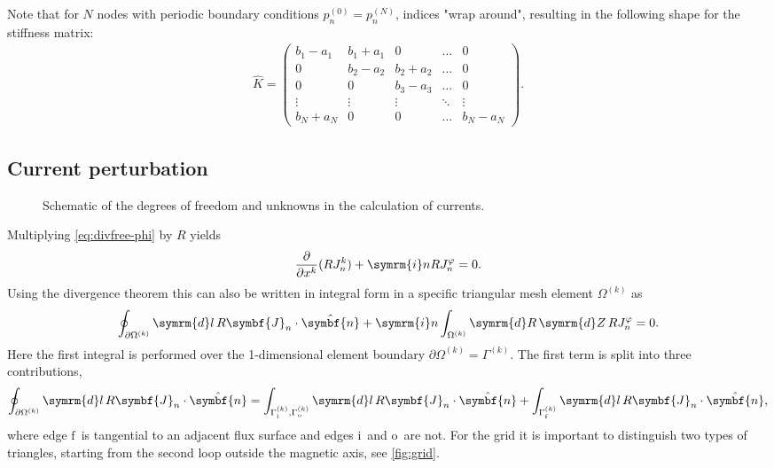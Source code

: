 \documentclass[a4paper, twoside, 10pt, english]{article}
\numberwithin{equation}{section}
\let\temp\varrho
\let\varrho\rho
\let\rho\temp
\let\temp\vartheta
\let\vartheta\theta
\let\theta\temp
\let\temp\varphi
\let\varphi\phi
\let\phi\temp
\let\vec\symbf
\newcommand*\diff{\ensuremath{\symrm{d}}}  %
\newcommand*\im{\ensuremath{\symrm{i}}}  %
\newcommand*\pd[2][]{\ensuremath{\frac{\partial #1}{\partial #2}}}  %
\newcommand*\fs{\ensuremath{\textrm{f}}}  %
\newcommand*\inw{\ensuremath{\textrm{i}}}  %
\newcommand*\out{\ensuremath{\textrm{o}}}  %
\begin{document}
Note that for $N$ nodes with periodic boundary conditions $p_{n}^{(0)} = p_{n}^{(N)}$, indices "wrap around", resulting in the following shape for the stiffness matrix:
\begin{gather*}
  \hat{K} = \begin{pmatrix}
    b_{1} - a_{1} &  b_{1} + a_{1} &        0       & \hdots &    0   \\
           0       & b_{2} - a_{2} &  b_{2} + a_{2} & \hdots &    0   \\
           0       &        0       & b_{3} - a_{3} & \hdots &    0   \\
        \vdots     &     \vdots     &     \vdots     & \ddots & \vdots \\
     b_{N} + a_{N} &        0       &        0       & \hdots & b_{N} - a_{N}
  \end{pmatrix}.
\end{gather*}

\subsection{Current perturbation}
\label{sec:compute_currn}

\begin{figure}[bth]
  \centering
  
  \caption{Schematic of the degrees of freedom and unknowns in the calculation of currents.}
  \label{fig:current_perturbation}
\end{figure}

Multiplying \cref{eq:divfree-phi} by $R$ yields
\begin{gather}
  \pd{x^{k}} (R J_{n}^{k}) + \im n R J_{n}^{\phi} = 0.
\end{gather}
Using the divergence theorem this can also be written in integral form in a specific triangular mesh element $\Omega^{(k)}$ as
\begin{gather}
  \oint_{\partial \Omega^{(k)}} \diff l \, R \vec{J}_{n} \cdot \hat{\vec{n}} + \im n \int_{\Omega^{(k)}} \diff R \, \diff Z \, R J_{n}^{\phi} = 0.
\end{gather}
Here the first integral is performed over the 1-dimensional element boundary $\partial \Omega^{(k)} = \Gamma^{(k)}$. The first term is split into three contributions,
\begin{gather}
  \oint_{\partial \Omega^{(k)}} \diff l \, R \vec{J}_{n} \cdot \hat{\vec{n}} = \int_{\Gamma_{\inw}^{(k)}, \Gamma_{\out}^{(k)}} \diff l \, R \vec{J}_{n} \cdot \hat{\vec{n}} + \int_{\Gamma_{\fs}^{(k)}} \diff l \, R \vec{J}_{n} \cdot \hat{\vec{n}},
\end{gather}
where edge \fs\ is tangential to an adjacent flux surface and edges \inw\ and \out\ are not. For the grid it is important to distinguish two types of triangles, starting from the second loop outside the magnetic axis, see \cref{fig:grid}.
\end{document}

